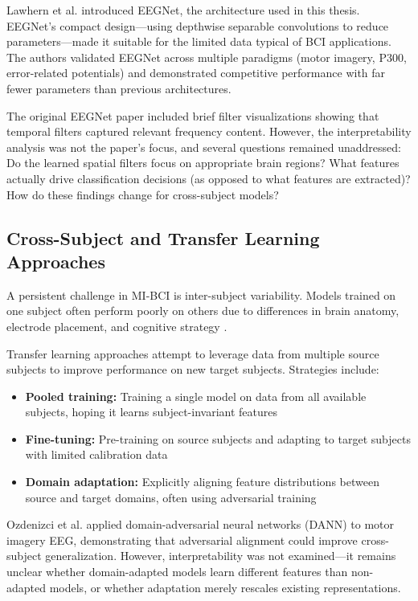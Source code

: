 Lawhern et al. \cite{lawhern2018eegnet} introduced EEGNet, the architecture used in this thesis. EEGNet's compact design—using depthwise separable convolutions to reduce parameters—made it suitable for the limited data typical of BCI applications. The authors validated EEGNet across multiple paradigms (motor imagery, P300, error-related potentials) and demonstrated competitive performance with far fewer parameters than previous architectures.

The original EEGNet paper included brief filter visualizations showing that temporal filters captured relevant frequency content. However, the interpretability analysis was not the paper's focus, and several questions remained unaddressed: Do the learned spatial filters focus on appropriate brain regions? What features actually drive classification decisions (as opposed to what features are extracted)? How do these findings change for cross-subject models?


\subsection{Cross-Subject and Transfer Learning Approaches}
\label{subsec:rw_transfer}

A persistent challenge in MI-BCI is inter-subject variability. Models trained on one subject often perform poorly on others due to differences in brain anatomy, electrode placement, and cognitive strategy \cite{wu2020transfer}.

Transfer learning approaches attempt to leverage data from multiple source subjects to improve performance on new target subjects. Strategies include:

\begin{itemize}
    \item \textbf{Pooled training:} Training a single model on data from all available subjects, hoping it learns subject-invariant features
    \item \textbf{Fine-tuning:} Pre-training on source subjects and adapting to target subjects with limited calibration data
    \item \textbf{Domain adaptation:} Explicitly aligning feature distributions between source and target domains, often using adversarial training \cite{ganin2016domain}
\end{itemize}

Ozdenizci et al. \cite{ozdenizci2020learning} applied domain-adversarial neural networks (DANN) to motor imagery EEG, demonstrating that adversarial alignment could improve cross-subject generalization. However, interpretability was not examined—it remains unclear whether domain-adapted models learn different features than non-adapted models, or whether adaptation merely rescales existing representations.

